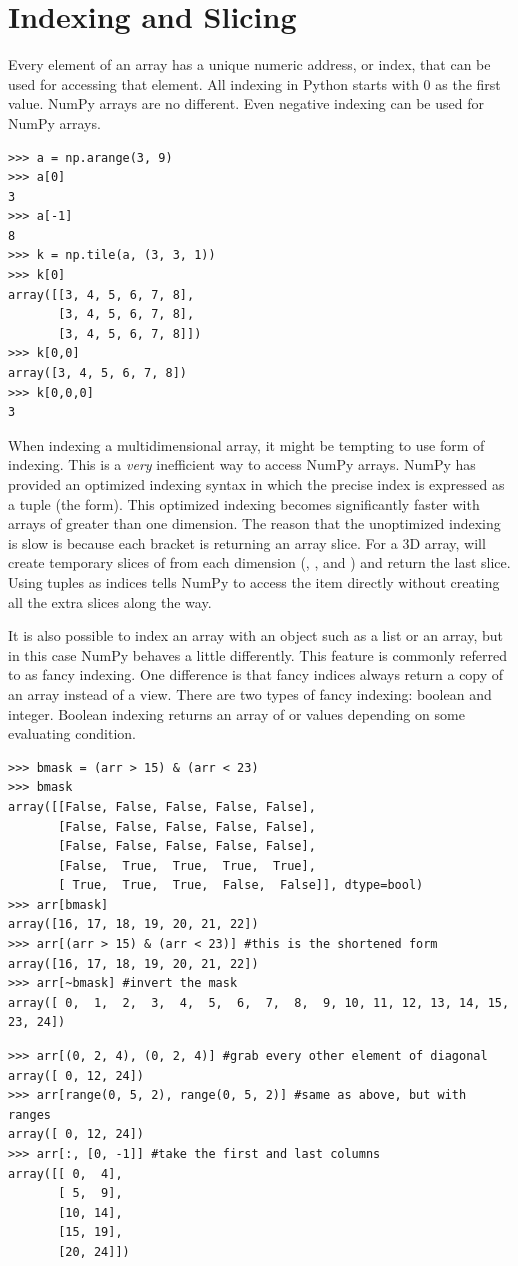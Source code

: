 \section*{Indexing and Slicing}
Every element of an array has a unique numeric address, or index, that can be used for accessing that element.
All indexing in Python starts with 0 as the first value.  
NumPy arrays are no different.  Even negative indexing can be used for NumPy arrays.
\begin{lstlisting}
>>> a = np.arange(3, 9)
>>> a[0]
3
>>> a[-1]
8
>>> k = np.tile(a, (3, 3, 1))
>>> k[0]
array([[3, 4, 5, 6, 7, 8],
       [3, 4, 5, 6, 7, 8],
       [3, 4, 5, 6, 7, 8]])
>>> k[0,0]
array([3, 4, 5, 6, 7, 8])
>>> k[0,0,0]
3
\end{lstlisting}
When indexing a multidimensional array, it might be tempting to use  form of indexing.  
This is a \emph{very} inefficient way to access NumPy arrays.
NumPy has provided an optimized indexing syntax in which the precise index is expressed as a tuple (the  form).  This optimized indexing becomes significantly faster with arrays of greater than one dimension.
The reason that the unoptimized indexing is slow is because each bracket is returning an array slice.  
For a 3D array,  will create temporary slices of  from each dimension (, , and ) and return the last slice.
Using tuples as indices tells NumPy to access the item directly without creating all the extra slices along the way.

It is also possible to index an array with an object such as a list or an array, but in this case NumPy behaves a little differently.
This feature is commonly referred to as fancy indexing.
One difference is that fancy indices always return a copy of an array instead of a view.
There are two types of fancy indexing: boolean and integer.
Boolean indexing returns an array of  or  values depending on some 
evaluating condition.
\begin{lstlisting}
>>> bmask = (arr > 15) & (arr < 23)
>>> bmask
array([[False, False, False, False, False],
       [False, False, False, False, False],
       [False, False, False, False, False],
       [False,  True,  True,  True,  True],
       [ True,  True,  True,  False,  False]], dtype=bool)
>>> arr[bmask]
array([16, 17, 18, 19, 20, 21, 22])
>>> arr[(arr > 15) & (arr < 23)] #this is the shortened form
array([16, 17, 18, 19, 20, 21, 22])
>>> arr[~bmask] #invert the mask
array([ 0,  1,  2,  3,  4,  5,  6,  7,  8,  9, 10, 11, 12, 13, 14, 15, 23, 24])
\end{lstlisting}
\begin{lstlisting}
>>> arr[(0, 2, 4), (0, 2, 4)] #grab every other element of diagonal
array([ 0, 12, 24])
>>> arr[range(0, 5, 2), range(0, 5, 2)] #same as above, but with ranges
array([ 0, 12, 24])
>>> arr[:, [0, -1]] #take the first and last columns
array([[ 0,  4],
       [ 5,  9],
       [10, 14],
       [15, 19],
       [20, 24]])
\end{lstlisting}

